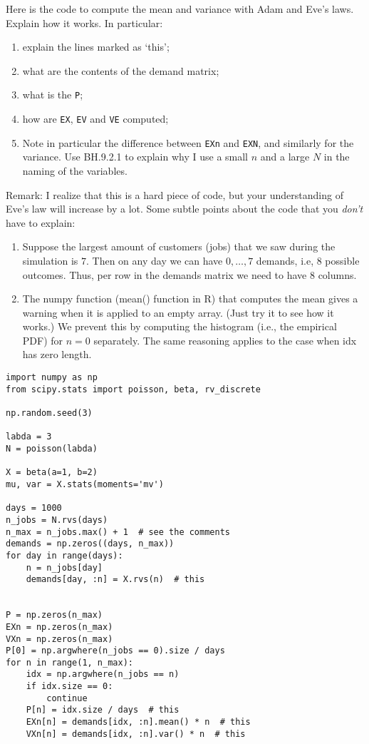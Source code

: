 \begin{exercise}
Here is the code to compute the mean and variance with Adam and Eve's laws. Explain how it works. In particular:
\begin{enumerate}
\item explain the lines marked as `this';
\item what are the contents of the demand matrix;
\item what is the \texttt{P};
\item how are \texttt{EX}, \texttt{EV} and \texttt{VE}  computed;
\item Note in particular the difference between \texttt{EXn} and \texttt{EXN}, and similarly for the variance. Use BH.9.2.1 to explain why I use a small $n$ and a large $N$ in the naming of the variables.
\end{enumerate}

Remark: I realize that this is a hard piece of code, but your understanding of Eve's law will increase by a lot. Some subtle points about the code that you \emph{don't} have to explain:
\begin{enumerate}
\item Suppose the largest amount of customers (jobs) that we saw during the simulation is $7$. Then on any day we can have $0, \ldots, 7$ demands, i.e, 8 possible outcomes. Thus, per row in the demands matrix we need to have 8 columns.
\item The numpy function (mean() function in R) that computes the mean gives a warning when it is applied to an empty array. (Just try it to see how it works.) We prevent this by computing the histogram (i.e., the empirical PDF) for $n=0$ separately. The same reasoning applies to the case when idx has zero length.
\end{enumerate}


\begin{verbatim}
import numpy as np
from scipy.stats import poisson, beta, rv_discrete

np.random.seed(3)

labda = 3
N = poisson(labda)

X = beta(a=1, b=2)
mu, var = X.stats(moments='mv')

days = 1000
n_jobs = N.rvs(days)
n_max = n_jobs.max() + 1  # see the comments
demands = np.zeros((days, n_max))
for day in range(days):
    n = n_jobs[day]
    demands[day, :n] = X.rvs(n)  # this


P = np.zeros(n_max)
EXn = np.zeros(n_max)
VXn = np.zeros(n_max)
P[0] = np.argwhere(n_jobs == 0).size / days
for n in range(1, n_max):
    idx = np.argwhere(n_jobs == n)
    if idx.size == 0:
        continue
    P[n] = idx.size / days  # this
    EXn[n] = demands[idx, :n].mean() * n  # this
    VXn[n] = demands[idx, :n].var() * n  # this


\end{verbatim}
\end{exercise}
